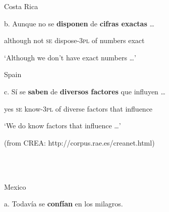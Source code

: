 \documentclass[output=paper]{langsci/langscibook}
\begin{document}
\begin{styleBodyTextIndentii}
  Costa Rica
\end{styleBodyTextIndentii}

\begin{styleBodyTextIndentii}
b.   Aunque   no   se \textbf{disponen}      de  \textbf{cifras       exactas} …   
\end{styleBodyTextIndentii}

\begin{styleBodyTextIndentii}
        although not \textsc{se}   dispose{}-\textsc{3pl}  of   numbers  exact
\end{styleBodyTextIndentii}

\begin{styleBodyTextIndentii}
       ‘Although we don’t have exact numbers …’
\end{styleBodyTextIndentii}

\begin{styleBodyTextIndentii}
  Spain
\end{styleBodyTextIndentii}

\begin{styleBodyTextIndentii}
c.   Sí   se  \textbf{saben}        de \textbf{diversos factores} que influyen …  
\end{styleBodyTextIndentii}

\begin{styleBodyTextIndentii}
       yes \textsc{se}   know{}-\textsc{3pl}  of  diverse   factors    that influence
\end{styleBodyTextIndentii}

\begin{styleBodyTextIndentii}
       ‘We do know factors that influence …’
\end{styleBodyTextIndentii}

\begin{styleBodyTextIndentii}
(from CREA: http://corpus.rae.es/creanet.html)
\end{styleBodyTextIndentii}

\begin{styleBodyTextIndentii}
\ea%
    \label{ex:key:29}
    \gll\\
        \\
    \glt
    \z

           Mexico
\end{styleBodyTextIndentii}

\begin{styleBodyTextIndentii}
a.   Todavía se   \textbf{confían}    en  los   milagros.   
\end{styleBodyTextIndentii}
\end{document}
